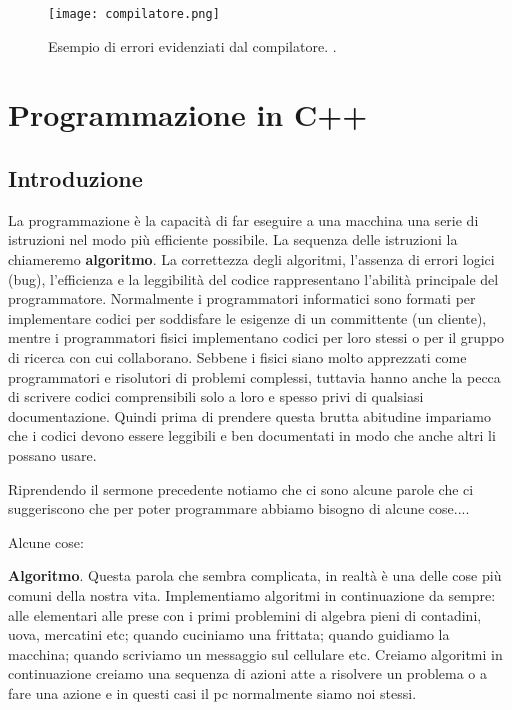\documentclass[11pt,fleqn]{book} %
\begin{document}
\begin{figure}[h]
\centering
\texttt{[image: compilatore.png]}
\caption{Esempio di errori evidenziati dal compilatore. \label{compilatore}.}
\end{figure}





\part{Programmazione in C++}



\chapter{Introduzione}

 La programmazione è la capacità di far eseguire a una macchina una serie di istruzioni nel modo più efficiente possibile. La sequenza delle istruzioni la chiameremo \textbf{algoritmo}. La correttezza degli algoritmi, l'assenza di errori logici (bug), l'efficienza e la leggibilità del codice rappresentano l'abilità principale del programmatore.
Normalmente i programmatori informatici sono formati per implementare codici per soddisfare le esigenze di un committente (un cliente), mentre i programmatori fisici implementano codici per loro stessi o per il gruppo di ricerca con cui collaborano.  Sebbene i fisici siano molto apprezzati come programmatori e risolutori di problemi complessi, tuttavia hanno anche  la pecca di scrivere codici comprensibili solo a loro e spesso privi di qualsiasi documentazione. Quindi prima di prendere questa brutta abitudine impariamo che i codici devono essere leggibili e ben documentati in modo che anche altri li possano usare.

Riprendendo il sermone precedente notiamo che ci sono alcune parole che ci suggeriscono che per poter programmare abbiamo bisogno di alcune cose....

Alcune cose:

\textbf{Algoritmo}. Questa parola che sembra complicata, in realtà è una delle cose più comuni della nostra vita. Implementiamo
algoritmi in continuazione da sempre: alle elementari alle prese con i primi problemini di algebra pieni di contadini, uova, mercatini etc; quando cuciniamo una frittata; quando guidiamo la macchina; quando scriviamo un messaggio sul cellulare etc. Creiamo algoritmi in continuazione
creiamo una sequenza di azioni atte a risolvere un problema o a fare una azione e in questi casi il pc normalmente siamo noi stessi.
\end{document}
